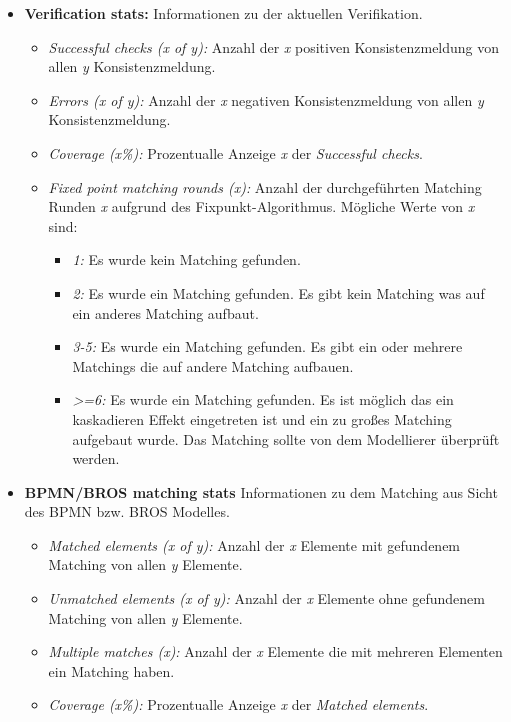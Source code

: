 \begin{itemize}
    \item \textbf{Verification stats:} Informationen zu der aktuellen Verifikation.
    \begin{itemize}
        \item \emph{Successful checks (x of y):} Anzahl der \emph{x} positiven Konsistenzmeldung von allen \emph{y} Konsistenzmeldung. 
        \item \emph{Errors (x of y):} Anzahl der \emph{x} negativen Konsistenzmeldung von allen \emph{y} Konsistenzmeldung. 
        \item \emph{Coverage (x\%):} Prozentualle Anzeige \emph{x} der \emph{Successful checks}.
        \item \emph{Fixed point matching rounds (x):} Anzahl der durchgeführten Matching Runden \emph{x} aufgrund des Fixpunkt-Algorithmus. Mögliche Werte von \emph{x} sind:
        \begin{itemize}
            \item \emph{1:} Es wurde kein Matching gefunden.
            \item \emph{2:} Es wurde ein Matching gefunden. Es gibt kein Matching was auf ein anderes Matching aufbaut.
            \item \emph{3-5:} Es wurde ein Matching gefunden. Es gibt ein oder mehrere Matchings die auf andere Matching aufbauen.
            \item \emph{>=6:} Es wurde ein Matching gefunden. Es ist möglich das ein kaskadieren Effekt eingetreten ist und ein zu großes Matching aufgebaut wurde. Das Matching sollte von dem Modellierer überprüft werden.
        \end{itemize}
    \end{itemize}
    \item \textbf{BPMN/BROS matching stats} Informationen zu dem Matching aus Sicht des BPMN bzw. BROS Modelles.
    \begin{itemize}
        \item \emph{Matched elements (x of y):} Anzahl der \emph{x} Elemente mit gefundenem Matching von allen \emph{y} Elemente.
        \item \emph{Unmatched elements (x of y):} Anzahl der \emph{x} Elemente ohne gefundenem Matching von allen \emph{y} Elemente.
        \item \emph{Multiple matches (x):} Anzahl der \emph{x} Elemente die mit mehreren Elementen ein Matching haben. 
        \item \emph{Coverage (x\%):} Prozentualle Anzeige \emph{x} der \emph{Matched elements}.
    \end{itemize}
\end{itemize}

